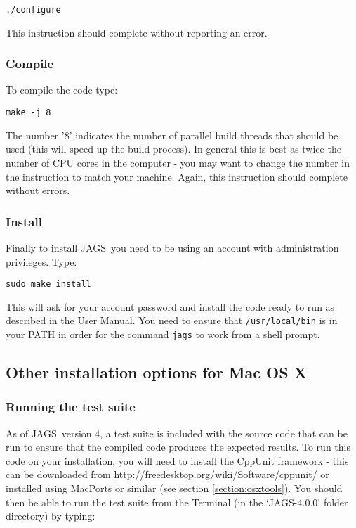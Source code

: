 \documentclass[11pt, a4paper, titlepage]{article}
\newcommand{\release}{4.0.0}
\newcommand{\JAGS}{\textsf{JAGS}}
\newcommand{\file}[1]{{`\normalfont\textsf{#1}'}}
\begin{document}
\begin{verbatim}
./configure
\end{verbatim}

This instruction should complete without reporting an error.

\subsubsection{Compile}
\label{section:osxcompile}

To compile the code type: 

\begin{verbatim} 
make -j 8 
\end{verbatim} 

The number '8' indicates the number of parallel build threads that
should be used (this will speed up the build process).  In general this
is best as twice the number of CPU cores in the computer - you may want
to change the number in the instruction to match your machine. Again,
this instruction should complete without errors.

\subsubsection{Install}
\label{section:osxinstall}

Finally to install \JAGS\ you need to be using an account with
administration privileges.  Type: 

\begin{verbatim}
sudo make install
\end{verbatim} 

This will ask for your account password and install the code ready to 
run as described in the User Manual. You need to ensure that
\texttt{/usr/local/bin} is in your PATH in order for the command 
\texttt{jags} to work from a shell prompt.

\subsection{Other installation options for Mac OS X}
\label{section:otherosxoptions}

\subsubsection{Running the test suite}

As of \JAGS\ version 4, a test suite is included with the source code that can be
run to ensure that the compiled code produces the expected results.  To run
this code on your installation, you will need to install the CppUnit framework - this can
be downloaded from \url{http://freedesktop.org/wiki/Software/cppunit/} or installed using
MacPorts or similar (see section \ref{section:osxtools}).  You should then be able to 
run the test suite from the Terminal  (in the \file{JAGS-\release} folder directory) by typing:
\end{document}
